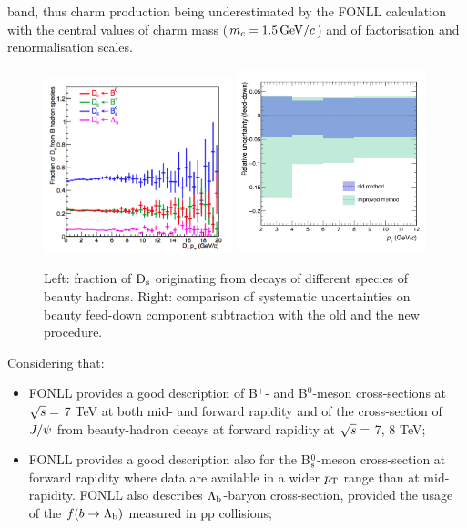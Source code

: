 band, thus charm production being underestimated by the FONLL
calculation with the central values of charm mass ($m_c = 1.5 \, \mathrm{GeV}/c$) and
of factorisation and renormalisation scales.\\
\begin{figure}[!h]
\begin{center}
\includegraphics[width=0.49\textwidth]{FigCap4/DsParents.png}
\includegraphics[width=0.49\textwidth]{FigCap4/comparisonFDerr_pass2_pass4.png}
\caption{Left: fraction of ${\rm D_s}$ originating from decays of different species of beauty hadrons. Right: comparison of systematic uncertainties on beauty feed-down component subtraction with the old and the new procedure.}
\label{fig:DsParentsAndFDunc}
\end{center}
\end{figure}
Considering that:
\begin{itemize}
\item FONLL provides a good description of B$^{+}$- and B$^{0}$-meson 
cross-sections at $\sqrt{s} =$ 7 TeV at both mid- and forward rapidity and of 
the cross-section of $J/{\rm \psi}$ from beauty-hadron decays at forward rapidity at  $\sqrt{s} =$ 7, 8 TeV;
\item FONLL provides a good description also for the 
B$^0_{\rm s}$-meson cross-section at forward rapidity where data are available in a wider $p_{\rm T}$ range 
than at mid-rapidity. FONLL also describes 
$\Lambda_{\rm b}$-baryon cross-section, provided 
the usage of the $f(b\rightarrow \Lambda_{\rm b})$ measured in pp collisions;
\end{itemize}
